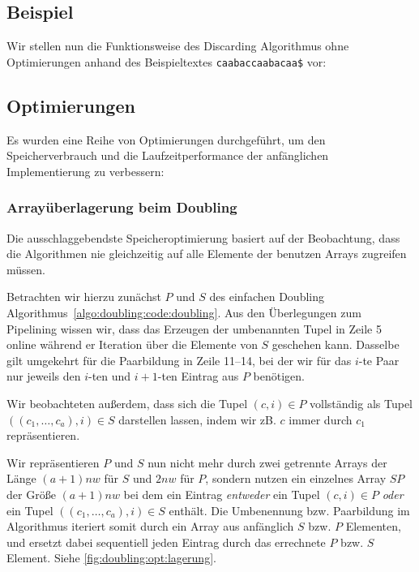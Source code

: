 \subsection{Beispiel}

Wir stellen nun die Funktionsweise des Discarding Algorithmus ohne Optimierungen anhand des Beispieltextes \texttt{caabaccaabacaa\$} vor:



\subsection{Optimierungen}
\label{algo:doubling:sec:usedoptimizations}

Es wurden eine Reihe von Optimierungen durchgeführt, um den Speicherverbrauch und die Laufzeitperformance der anfänglichen Implementierung zu verbessern:

\subsubsection{Arrayüberlagerung beim Doubling} Die ausschlaggebendste Speicheroptimierung basiert auf der Beobachtung, dass die Algorithmen nie gleichzeitig auf alle Elemente der benutzen Arrays zugreifen müssen.

Betrachten wir hierzu zunächst $P$ und $S$ des einfachen Doubling Algorithmus~\ref{algo:doubling:code:doubling}. Aus den Überlegungen zum Pipelining wissen wir, dass das Erzeugen der umbenannten Tupel in Zeile 5 online während er Iteration über die Elemente von $S$ geschehen kann. Dasselbe gilt umgekehrt für die Paarbildung in Zeile 11--14, bei der wir für das $i$-te Paar nur jeweils den $i$-ten und $i+1$-ten Eintrag aus $P$ benötigen. 

Wir beobachteten außerdem, dass sich die Tupel $(c, i) \in P$ vollständig als Tupel $((c_1, \dots, c_a), i) \in S$ darstellen lassen, indem wir zB. $c$ immer durch $c_1$ repräsentieren.

Wir repräsentieren $P$ und $S$ nun nicht mehr durch zwei getrennte Arrays der Länge $(a + 1)nw$ für $S$ und $2nw$ für $P$, sondern nutzen ein einzelnes Array $SP$ der Größe $(a + 1)nw$  bei dem ein Eintrag \textit{entweder} ein Tupel $(c, i) \in P$ \textit{oder} ein Tupel $((c_1, \dots, c_a), i) \in S$ enthält. Die Umbenennung bzw. Paarbildung im Algorithmus iteriert somit durch ein Array aus anfänglich $S$ bzw. $P$ Elementen, und ersetzt dabei sequentiell jeden Eintrag durch das errechnete $P$ bzw. $S$ Element. Siehe \cref{fig:doubling:opt:lagerung}.

